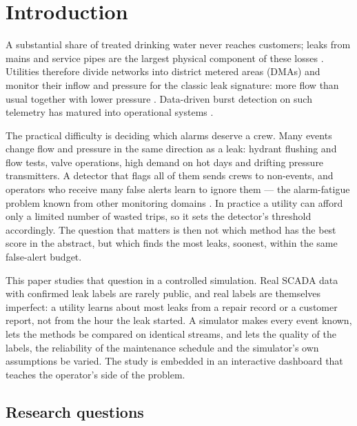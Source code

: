 \documentclass[11pt,a4paper]{article}
\begin{document}
\section{Introduction}

A substantial share of treated drinking water never reaches customers; leaks from mains and service pipes are the largest physical component of these losses \cite{lambert2002,farley2003}. Utilities therefore divide networks into district metered areas (DMAs) and monitor their inflow and pressure for the classic leak signature: more flow than usual together with lower pressure \cite{puust2010,farley2003}. Data-driven burst detection on such telemetry has matured into operational systems \cite{mounce2010,romano2014,wu2017}.

The practical difficulty is deciding which alarms deserve a crew. Many events change flow and pressure in the same direction as a leak: hydrant flushing and flow tests, valve operations, high demand on hot days and drifting pressure transmitters. A detector that flags all of them sends crews to non-events, and operators who receive many false alerts learn to ignore them --- the alarm-fatigue problem known from other monitoring domains \cite{cvach2012,parasuraman1997,bainbridge1983}. In practice a utility can afford only a limited number of wasted trips, so it sets the detector's threshold accordingly. The question that matters is then not which method has the best score in the abstract, but which finds the most leaks, soonest, within the same false-alert budget.

This paper studies that question in a controlled simulation. Real SCADA data with confirmed leak labels are rarely public, and real labels are themselves imperfect: a utility learns about most leaks from a repair record or a customer report, not from the hour the leak started. A simulator makes every event known, lets the methods be compared on identical streams, and lets the quality of the labels, the reliability of the maintenance schedule and the simulator's own assumptions be varied. The study is embedded in an interactive dashboard that teaches the operator's side of the problem.

\subsection{Research questions}
\end{document}
